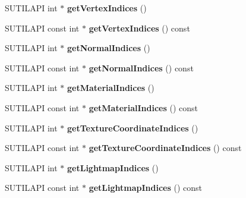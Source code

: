 \begin{DoxyCompactItemize}
S\+U\+T\+I\+L\+A\+PI int $\ast$ {\bfseries get\+Vertex\+Indices} ()
\item 
\mbox{\label{class_device_mesh_storage_a029473df5667ed374ee8d1870c8fba0e}} 
S\+U\+T\+I\+L\+A\+PI const int $\ast$ {\bfseries get\+Vertex\+Indices} () const
\item 
\mbox{\label{class_device_mesh_storage_a45a5476b381c5bdd8cd857db6c231ec5}} 
S\+U\+T\+I\+L\+A\+PI int $\ast$ {\bfseries get\+Normal\+Indices} ()
\item 
\mbox{\label{class_device_mesh_storage_a0997aa57e0c2cec214c6d98aff3c22d4}} 
S\+U\+T\+I\+L\+A\+PI const int $\ast$ {\bfseries get\+Normal\+Indices} () const
\item 
\mbox{\label{class_device_mesh_storage_a081399bdc7d0607cd2eb0d7c661d2f70}} 
S\+U\+T\+I\+L\+A\+PI int $\ast$ {\bfseries get\+Material\+Indices} ()
\item 
\mbox{\label{class_device_mesh_storage_a29cfb1aad691384efb9eaf21bf317cd5}} 
S\+U\+T\+I\+L\+A\+PI const int $\ast$ {\bfseries get\+Material\+Indices} () const
\item 
\mbox{\label{class_device_mesh_storage_adb7582b59fcd27c40cd62098c1c7b0eb}} 
S\+U\+T\+I\+L\+A\+PI int $\ast$ {\bfseries get\+Texture\+Coordinate\+Indices} ()
\item 
\mbox{\label{class_device_mesh_storage_ad19eb08b6926e4b2da078aa3368f06c6}} 
S\+U\+T\+I\+L\+A\+PI const int $\ast$ {\bfseries get\+Texture\+Coordinate\+Indices} () const
\item 
\mbox{\label{class_device_mesh_storage_a010ad802183570a9c24fa9686f415ed8}} 
S\+U\+T\+I\+L\+A\+PI int $\ast$ {\bfseries get\+Lightmap\+Indices} ()
\item 
\mbox{\label{class_device_mesh_storage_ac1a1ab44d979a609cf0deafa09d5188f}} 
S\+U\+T\+I\+L\+A\+PI const int $\ast$ {\bfseries get\+Lightmap\+Indices} () const
\item 
\mbox{\label{class_device_mesh_storage_a47b325cf483f5f8941b3989badfaaf4d}} 

\end{DoxyCompactItemize}
